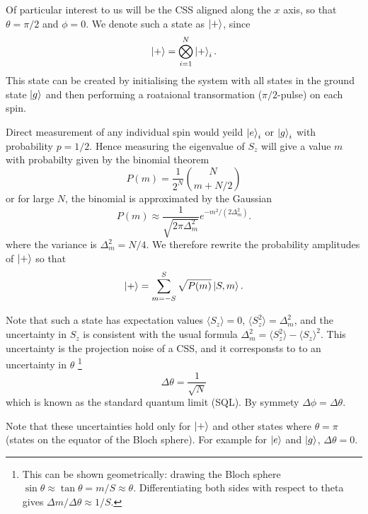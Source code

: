 \documentclass{article}
\begin{document}
Of particular interest to us will be the CSS aligned along the $x$ axis, so
that $\theta = \pi/2$ and $\phi = 0$. We denote such a state as $\ket{+}$, since
%
\begin{equation}
  \ket{+} = \bigotimes_{i=1}^N \ket{+}_i.
\end{equation}
%
This state can be created by initialising the system with all states in the
ground state $\ket{g}$ and then performing a roataional transormation
($\pi/2$-pulse) on each spin.

Direct measurement of any individual spin would yeild $\ket{e}_i$ or
$\ket{g}_i$ with probability $p=1/2$. Hence measuring the eigenvalue of $S_z$
will give a value $m$ with probabilty given by the binomial theorem~\cite{}
%
\begin{equation}
  P(m) = \frac{1}{2^N} {N \choose m +N/2}
\end{equation}
%
or for large $N$, the binomial is approximated by the Gaussian
%
\begin{equation}
  P(m) \approx\frac{1}{\sqrt{2\pi \Delta_m^2}} e^{-m^2/(2\Delta_m^2)}.
\end{equation}
%
where the variance is $\Delta_m^2 = N/4$. We therefore rewrite the probability
amplitudes of $\ket{+}$ so that
%
\begin{equation}
  \ket{+} = \sum_{m=-S}^S \sqrt{P(m)}\ket{S,m}.
\end{equation}

Note that such a state has expectation values $\langle S_z \rangle = 0$,
$\langle S_z^2\rangle = \Delta_m^2$, and the uncertainty in $S_z$ is consistent
with the usual formula $\Delta_m^2 = \langle S_z^2 \rangle - \langle
S_z\rangle^2$. This uncertainty is the projection noise of a CSS, and it
corresponsts to to an uncertainty in $\theta$
%
\footnote{This can be shown geometrically: drawing the Bloch sphere $\sin
\theta \approx \tan \theta = m/S \approx \theta$. Differentiating both sides
with respect to theta gives $\Delta m / \Delta \theta \approx 1/S$.
}
%
\begin{equation}
  \Delta\theta = \frac{1}{\sqrt{N}}
\end{equation}
which is known as the standard quantum limit (SQL). By symmety $\Delta \phi =
\Delta \theta$.

Note that these uncertainties hold only for $\ket{+}$ and other states where
$\theta = \pi$ (states on the equator of the Bloch sphere). For example for
$\ket{e}$ and $\ket{g}$, $\Delta \theta = 0$. %
\end{document}
